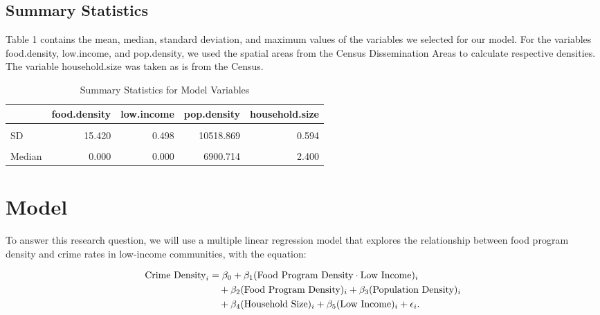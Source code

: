 \documentclass[AEJ]{AEA}
\begin{document}
\subsection{Summary Statistics}

Table 1 contains the mean, median, standard deviation, and maximum values of the variables we selected for our model. For the variables food.density, low.income, and pop.density, we used the spatial areas from the Census Dissemination Areas to calculate respective densities. The variable household.size was taken as is from the Census.

\begin{table}
\centering
\caption{Summary Statistics for Model Variables}
\centering
\begin{tabular}[t]{lrrrr}
\toprule
  & food.density & low.income & pop.density & household.size\\
\midrule
\cellcolor{gray!10}{Mean} & \cellcolor{gray!10}{1.199} & \cellcolor{gray!10}{0.459} & \cellcolor{gray!10}{10258.448} & \cellcolor{gray!10}{2.311}\\
SD & 15.420 & 0.498 & 10518.869 & 0.594\\
\cellcolor{gray!10}{Max} & \cellcolor{gray!10}{386.598} & \cellcolor{gray!10}{1.000} & \cellcolor{gray!10}{76474.359} & \cellcolor{gray!10}{3.800}\\
Median & 0.000 & 0.000 & 6900.714 & 2.400\\
\bottomrule
\end{tabular}
\end{table}

\section{Model}

To answer this research question, we will use a multiple linear regression model that explores the relationship between food program density and crime rates in low-income communities, with the equation:


\begin{align}
\text{Crime Density}_i &= \beta_0 + \beta_1 (\text{Food Program Density} \cdot \text{Low Income})_i \notag \\
&\quad + \beta_2 (\text{Food Program Density})_i + \beta_3 (\text{Population Density})_i \notag \\
&\quad + \beta_4 (\text{Household Size})_i + \beta_5 (\text{Low Income})_i + \epsilon_i.
\end{align}
\end{document}
